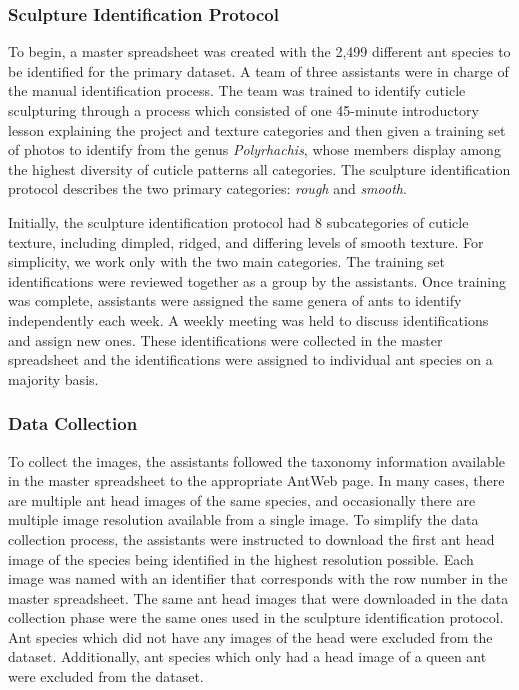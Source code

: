 \documentclass[12pt]{article}
\begin{document}
\subsubsection{Sculpture Identification Protocol}

To begin, a master spreadsheet was created with the 2,499 different ant species
to be identified for the primary dataset. A team of three assistants were in
charge of the manual identification process. The team was trained to identify
cuticle sculpturing through a process which consisted of one 45-minute
introductory lesson explaining the project and texture categories and then given
a training set of photos to identify from the genus \textit{Polyrhachis}, whose
members display among the highest diversity of cuticle patterns all categories.
The sculpture identification protocol describes the two primary categories:
\textit{rough} and \textit{smooth}.

Initially, the sculpture identification protocol had 8 subcategories of cuticle
texture, including dimpled, ridged, and differing levels of smooth texture. For
simplicity, we work only with the two main categories. The training set
identifications were reviewed together as a group by the assistants. Once
training was complete, assistants were assigned the same genera of ants to
identify independently each week. A weekly meeting was held to discuss
identifications and assign new ones. These identifications were collected in the
master spreadsheet and the identifications were assigned to individual ant
species on a majority basis.

\subsubsection{Data Collection}

To collect the images, the assistants followed the taxonomy information
available in the master spreadsheet to the appropriate AntWeb page. In many
cases, there are multiple ant head images of the same species, and occasionally
there are multiple image resolution available from a single image. To simplify
the data collection process, the assistants were instructed to download the
first ant head image of the species being identified in the highest resolution
possible. Each image was named with an identifier that corresponds with the row
number in the master spreadsheet. The same ant head images that were downloaded
in the data collection phase were the same ones used in the sculpture
identification protocol. Ant species which did not have any images of the head
were excluded from the dataset. Additionally, ant species which only had a head
image of a queen ant were excluded from the dataset.
\end{document}
